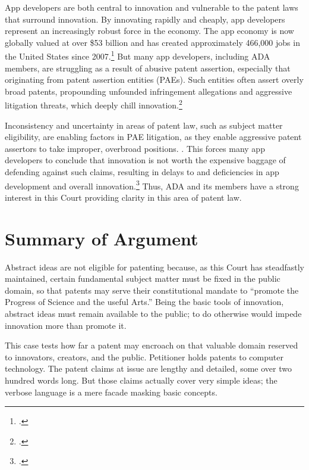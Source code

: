 \documentclass{scotus}
\begin{document}
App developers are both central to innovation and vulnerable to the patent laws
that surround innovation. By innovating rapidly and cheaply, app developers
represent an increasingly robust force in the economy. The app economy is now
globally valued at over \$53 billion and has
created approximately 466,000 jobs in the United States since
2007.\footnote{.} But many app developers,
including
ADA members, are struggling as a result of abusive patent assertion, especially
that originating from patent assertion entities (PAEs). Such entities often
assert overly broad patents, propounding unfounded infringement allegations and
aggressive litigation threats, which deeply chill
innovation.\footnote{.}

Inconsistency and uncertainty in areas of patent law, such as subject matter
eligibility, are enabling factors in PAE litigation, as they enable aggressive
patent assertors to take improper, overbroad positions.
. This forces many
app developers to conclude that innovation is not worth the expensive baggage of
defending against such claims, resulting in delays to and deficiencies in app
development and overall innovation.\footnote{.} Thus,
ADA and its members have a strong interest in this Court providing clarity in
this area of patent law.




\clearpage

\part{Summary of Argument}

Abstract ideas are not eligible for patenting because, as this Court has
steadfastly maintained, certain fundamental subject matter must be fixed in the
public domain, so that patents may serve their constitutional mandate to
``promote the Progress of Science and the useful Arts.'' Being the basic tools
of innovation, abstract ideas must remain available to the public; to do
otherwise would impede innovation more than promote it.

This case tests how far a patent may encroach on that valuable domain
reserved to innovators, creators, and the public. Petitioner holds patents
to computer technology. The patent claims at issue are
lengthy and detailed, some over two hundred words long. But those claims
actually cover very simple ideas; the verbose language is a mere facade
masking basic concepts.
\end{document}
